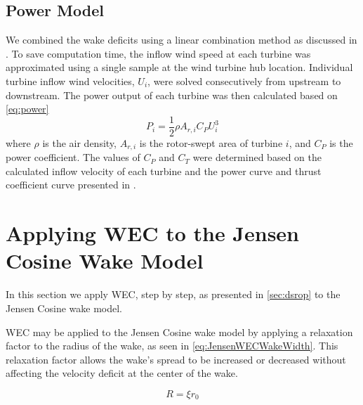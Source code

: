 \documentclass[a4paper]{jpconf}
\begin{document}
\subsection{Power Model}
We combined the wake deficits using a linear combination method as discussed in \cite{niayifar2016}. To save computation time, the inflow wind speed at each turbine was approximated using a single sample at the wind turbine hub location. Individual turbine inflow wind velocities, $U_i$, were solved consecutively from upstream to downstream. The power output of each turbine was then calculated based on \cref{eq:power}
%
\begin{equation}\label{eq:power}
P_i = \frac{1}{2}\rho A_{r,i}C_P U_i^3
\end{equation}
%
where $\rho$ is the air density, $A_{r,i}$ is the rotor-swept area of turbine $i$, and $C_P$ is the power coefficient. The values of $C_P$ and $C_T$ were determined based on the calculated inflow velocity of each turbine and the power curve and thrust coefficient curve presented in \cite{niayifar2016}.

\section{Applying WEC to the Jensen Cosine Wake Model}
In this section we apply WEC, step by step, as presented in \cref{sec:dsrop} to the Jensen Cosine wake model.  


WEC may be applied to the Jensen Cosine wake model by applying a relaxation factor to the radius of the wake, as seen in \cref{eq:JensenWECWakeWidth}. This relaxation factor allows the wake's spread to be increased or decreased without affecting the velocity deficit at the center of the wake.

\begin{equation}
    R = \xi r_0
    \label{eq:JensenWECWakeWidth}
\end{equation}
\end{document}
